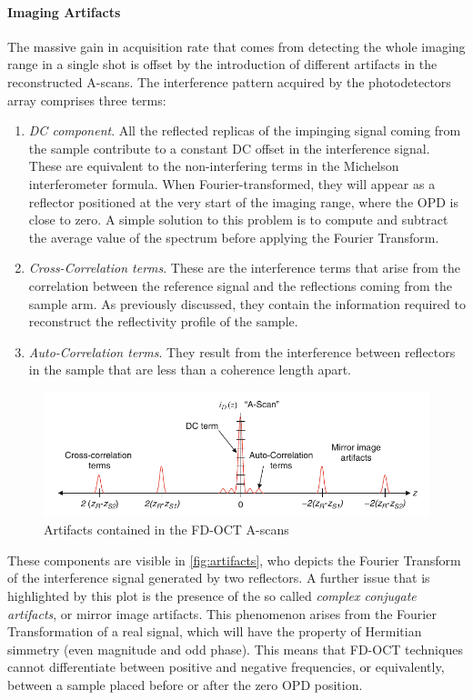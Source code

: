\paragraph{Imaging Artifacts} The massive gain in acquisition rate that comes from detecting the whole imaging range in a single shot is offset by the introduction of different artifacts in the reconstructed A-scans. The interference pattern acquired by the photodetectors array comprises three terms:
\begin{enumerate}
	\item \emph{DC component}. All the reflected replicas of the impinging signal coming from the sample contribute to a constant DC offset in the interference signal. These are equivalent to the non-interfering terms in the Michelson interferometer formula. When Fourier-transformed, they will appear as a reflector positioned at the very start of the imaging range, where the \ac{OPD} is close to zero. A simple solution to this problem is to compute and subtract the average value of the spectrum before applying the Fourier Transform.
	
	\item \emph{Cross-Correlation terms}. These are the interference terms that arise from the correlation between the reference signal and the reflections coming from the sample arm. As previously discussed, they contain the information required to reconstruct the reflectivity profile of the sample. 
	
	\item \emph{Auto-Correlation terms}. They result from the interference between reflectors in the sample that are less than a coherence length apart. 
\end{enumerate}


\begin{figure}[hbt]
	\myfloatalign
	\includegraphics[width=\linewidth]{gfx/ch2/fdoct-artifacts}
	\caption{Artifacts contained in the \ac{FD-OCT} A-scans\cite{Drexler2015}}\label{fig:artifacts}
\end{figure}

These components are visible in \autoref{fig:artifacts}, who depicts the Fourier Transform of the interference signal generated by two reflectors. A further issue that is highlighted by this plot is the presence of the so called \emph{complex conjugate artifacts}, or mirror image artifacts. This phenomenon arises from the Fourier Transformation of a real signal, which will have the property of Hermitian simmetry (even magnitude and odd phase). This means that \ac{FD-OCT} techniques cannot differentiate between positive and negative frequencies, or equivalently, between a sample placed before or after the zero \ac{OPD} position. 

